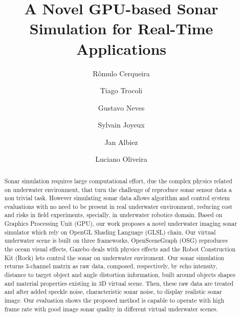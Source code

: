 \documentclass[final,5p,times]{elsarticle}
\begin{document}
\begin{frontmatter}



\title{A Novel GPU-based Sonar Simulation for Real-Time Applications}

\author[senai,ufba]{Rômulo Cerqueira} 
\author[senai]{Tiago Trocoli} 
\author[senai]{Gustavo Neves}
\author[senai]{Sylvain Joyeux}
\author[senai,dfki]{Jan Albiez}
\author[ufba]{Luciano Oliveira}

\address[senai]{Brazilian Institute of Robotics, SENAI CIMATEC, Salvador, Bahia, Brazil}
\address[ufba]{Intelligent Vision Research Lab, Federal University of Bahia, Salvador, Bahia, Brazil}
\address[dfki]{Robotics Innovation Center, DFKI GmbH, Bremen, Germany}

\begin{abstract}

Sonar simulation requires large computational effort, due the complex physics related on underwater environment, that turn the challenge of reproduce sonar sensor data a non trivial task. However simulating sonar data allows algorithm and control system evaluations with no need to be present in real underwater environment, reducing cost and risks in field experiments, specially, in underwater robotics domain. Based on Graphics Processing Unit (GPU), our work proposes a novel underwater imaging sonar simulator which rely on OpenGL Shading Language (GLSL) chain. Our virtual underwater scene is built on three frameworks, OpenSceneGraph (OSG) reproduces the ocean visual effects, Gazebo deals with physics effects and the Robot Construction Kit (Rock) lets control the sonar on underwater enviroment. Our sonar simulation returns 3-channel matrix as raw data, composed, respectively, by echo intensity, distance to target object and angle distortion information, built around objects shapes and material properties existing in 3D virtual scene. Then, these raw data are treated and after added speckle noise, characteristic sonar noise, to display realistic sonar image. Our evaluation shows the proposed method is capable to operate with high frame rate with good image sonar quality in different virtual underwater scenes.




\end{abstract}
\end{frontmatter}
\end{document}
